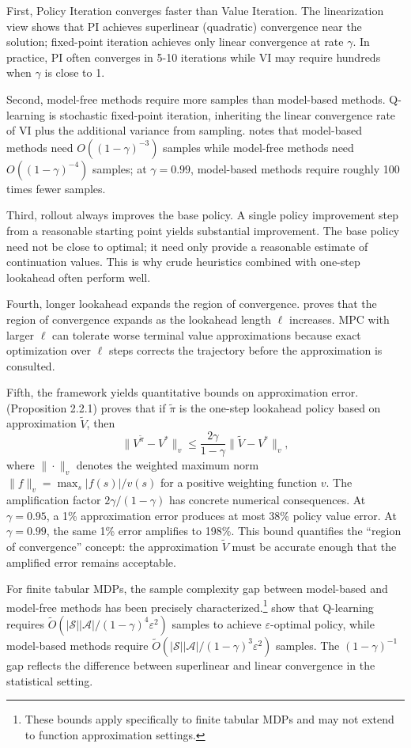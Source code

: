 First, Policy Iteration converges faster than Value Iteration. The linearization view shows that PI achieves superlinear (quadratic) convergence near the solution; fixed-point iteration achieves only linear convergence at rate $\gamma$. In practice, PI often converges in 5-10 iterations while VI may require hundreds when $\gamma$ is close to 1.

Second, model-free methods require more samples than model-based methods. Q-learning is stochastic fixed-point iteration, inheriting the linear convergence rate of VI plus the additional variance from sampling. \citet{bertsekas2024} notes that model-based methods need $O((1-\gamma)^{-3})$ samples while model-free methods need $O((1-\gamma)^{-4})$ samples; at $\gamma = 0.99$, model-based methods require roughly 100 times fewer samples.

Third, rollout always improves the base policy. A single policy improvement step from a reasonable starting point yields substantial improvement. The base policy need not be close to optimal; it need only provide a reasonable estimate of continuation values. This is why crude heuristics combined with one-step lookahead often perform well.

Fourth, longer lookahead expands the region of convergence. \citet{bertsekas2024} proves that the region of convergence expands as the lookahead length $\ell$ increases. MPC with larger $\ell$ can tolerate worse terminal value approximations because exact optimization over $\ell$ steps corrects the trajectory before the approximation is consulted.

Fifth, the framework yields quantitative bounds on approximation error. \citet{bertsekas2022} (Proposition 2.2.1) proves that if $\tilde{\pi}$ is the one-step lookahead policy based on approximation $\tilde{V}$, then
\[
\|V^{\tilde{\pi}} - V^*\|_v \leq \frac{2\gamma}{1-\gamma} \|\tilde{V} - V^*\|_v,
\]
where $\|\cdot\|_v$ denotes the weighted maximum norm $\|f\|_v = \max_s |f(s)|/v(s)$ for a positive weighting function $v$. The amplification factor $2\gamma/(1-\gamma)$ has concrete numerical consequences. At $\gamma = 0.95$, a 1\% approximation error produces at most 38\% policy value error. At $\gamma = 0.99$, the same 1\% error amplifies to 198\%. This bound quantifies the ``region of convergence'' concept: the approximation $\tilde{V}$ must be accurate enough that the amplified error remains acceptable.

For finite tabular MDPs, the sample complexity gap between model-based and model-free methods has been precisely characterized.\footnote{These bounds apply specifically to finite tabular MDPs and may not extend to function approximation settings.} \citet{li2024minimax} show that Q-learning requires $\tilde{O}(|\mathcal{S}||\mathcal{A}|/(1-\gamma)^4\varepsilon^2)$ samples to achieve $\varepsilon$-optimal policy, while model-based methods require $\tilde{O}(|\mathcal{S}||\mathcal{A}|/(1-\gamma)^3\varepsilon^2)$ samples. The $(1-\gamma)^{-1}$ gap reflects the difference between superlinear and linear convergence in the statistical setting.



